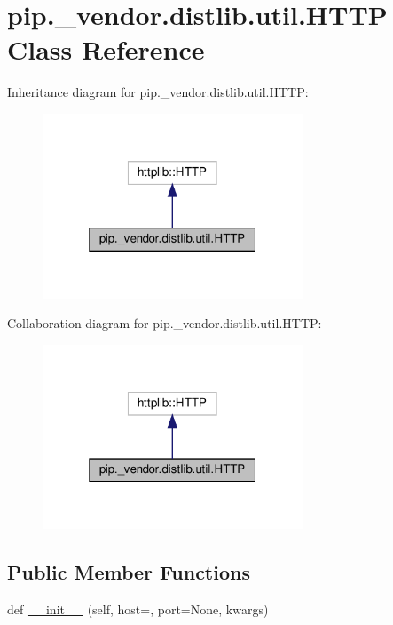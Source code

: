 \hypertarget{classpip_1_1__vendor_1_1distlib_1_1util_1_1HTTP}{}\section{pip.\+\_\+vendor.\+distlib.\+util.\+H\+T\+TP Class Reference}
\label{classpip_1_1__vendor_1_1distlib_1_1util_1_1HTTP}


Inheritance diagram for pip.\+\_\+vendor.\+distlib.\+util.\+H\+T\+TP\+:
\nopagebreak
\begin{figure}[H]
\begin{center}
\leavevmode
\includegraphics[width=220pt]{classpip_1_1__vendor_1_1distlib_1_1util_1_1HTTP__inherit__graph}
\end{center}
\end{figure}


Collaboration diagram for pip.\+\_\+vendor.\+distlib.\+util.\+H\+T\+TP\+:
\nopagebreak
\begin{figure}[H]
\begin{center}
\leavevmode
\includegraphics[width=220pt]{classpip_1_1__vendor_1_1distlib_1_1util_1_1HTTP__coll__graph}
\end{center}
\end{figure}
\subsection*{Public Member Functions}
\begin{DoxyCompactItemize}
\item 
def \hyperlink{classpip_1_1__vendor_1_1distlib_1_1util_1_1HTTP_a3021c8c75b74eff330883ac16eaf02be}{\+\_\+\+\_\+init\+\_\+\+\_\+} (self, host=\textquotesingle{}\textquotesingle{}, port=None, kwargs)
\end{DoxyCompactItemize}


